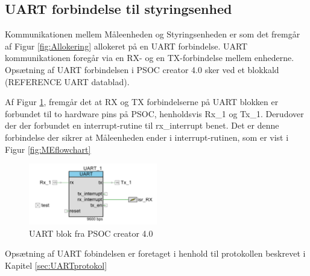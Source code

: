 
\subsection{UART forbindelse til styringsenhed}

Kommunikationen mellem Måleenheden og Styringsenheden er som det fremgår af Figur \ref{fig:Allokering} allokeret på en UART forbindelse. UART kommunikationen foregår via en RX- og en TX-forbindelse mellem enhederne. Opsætning af UART forbindelsen i PSOC creator 4.0 sker ved et blokkald (REFERENCE UART datablad). 

Af Figur \ref{fig:MEUART}, fremgår det at RX og TX forbindelserne på UART blokken er forbundet til to hardware pins på PSOC, henholdsvis Rx\_1 og Tx\_1. Derudover der der forbundet en interrupt-rutine til rx\_interrupt benet. Det er denne forbindelse der sikrer at Måleenheden ender i interrupt-rutinen, som er vist i Figur \ref{fig:MEflowchart}
\begin{figure}[H] %
	\centering
	\includegraphics[width=0.5\textwidth]{Figure/MEUART}
	\caption{UART blok fra PSOC creator 4.0}
	\label{fig:MEUART}
\end{figure}

Opsætning af UART fobindelsen er foretaget i henhold til protokollen beskrevet i Kapitel \ref{sec:UARTprotokol}